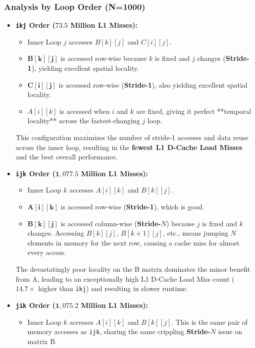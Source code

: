 \documentclass[11pt, a4paper]{article}
\begin{document}
\subsubsection{Analysis by Loop Order (N=1000)}

\begin{itemize}
    \item \textbf{\texttt{ikj} Order ($\mathbf{73.5}$ Million L1 Misses):}
    \begin{itemize}
        \item Inner Loop $j$ accesses $B[k][j]$ and $C[i][j]$.
        \item $\mathbf{B[k][j]}$ is accessed row-wise because $k$ is fixed and $j$ changes (\textbf{Stride-1}), yielding excellent spatial locality.
        \item $\mathbf{C[i][j]}$ is accessed row-wise (\textbf{Stride-1}), also yielding excellent spatial locality.
        \item $A[i][k]$ is accessed when $i$ and $k$ are fixed, giving it perfect **temporal locality** across the fastest-changing $j$ loop.
    \end{itemize}
    This configuration maximizes the number of stride-1 accesses and data reuse across the inner loop, resulting in the \textbf{fewest L1 D-Cache Load Misses} and the best overall performance.
    \item \textbf{\texttt{ijk} Order ($\mathbf{1,077.5}$ Million L1 Misses):}
    \begin{itemize}
        \item Inner Loop $k$ accesses $A[i][k]$ and $B[k][j]$.
        \item $\mathbf{A[i][k]}$ is accessed row-wise (\textbf{Stride-1}), which is good.
        \item $\mathbf{B[k][j]}$ is accessed column-wise (\textbf{Stride-$N$}) because $j$ is fixed and $k$ changes. Accessing $B[k][j]$, $B[k+1][j]$, etc., means jumping $N$ elements in memory for the next row, causing a cache miss for almost every access.
    \end{itemize}
    The devastatingly poor locality on the B matrix dominates the minor benefit from A, leading to an exceptionally high L1 D-Cache Load Miss count ($\mathbf{14.7\times}$ higher than \texttt{ikj}) and resulting in slower runtime.
    \item \textbf{\texttt{jik} Order ($\mathbf{1,075.2}$ Million L1 Misses):}
    \begin{itemize}
        \item Inner Loop $k$ accesses $A[i][k]$ and $B[k][j]$. This is the same pair of memory accesses as \texttt{ijk}, sharing the same crippling \textbf{Stride-$N$} issue on matrix B.

\end{itemize}
\end{itemize}
\end{document}
